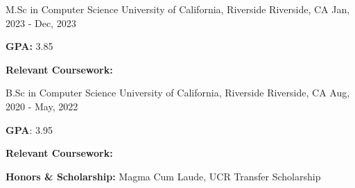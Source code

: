 
\begin{cventries}
    
  \cventry
    {M.Sc in Computer Science } %
    {University of California, Riverside} %
    {Riverside, CA} %
    {Jan, 2023 - Dec, 2023} %
    {
      \begin{cvitems}
      \item [] {\textbf{GPA:} 3.85}
      \item [] {
          \begin{flushleft}
            \textbf{Relevant Coursework:}
          \end{flushleft}
        }
      \end{cvitems}
    }
    
  \cventry
    {B.Sc in Computer Science} %
    {University of California, Riverside} %
    {Riverside, CA} %
    {Aug, 2020 -  May, 2022} %
    {
      \begin{cvitems} %
        \item [] {\textbf{GPA}: 3.95}
        \item [] {
          \begin{flushleft}
            \textbf{Relevant Coursework:}
          \end{flushleft}
        }
        \item [] {\textbf{Honors \& Scholarship:} Magma Cum Laude, UCR Transfer Scholarship}
      \end{cvitems}
    }
\end{cventries}
